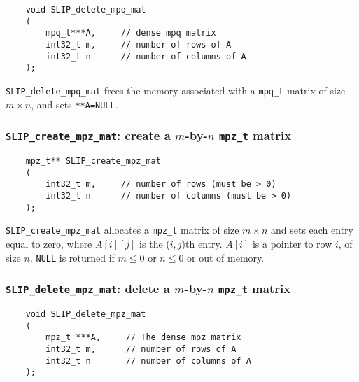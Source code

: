 \documentclass[12pt]{article}
\theoremstyle{definition}
\begin{document}
\begin{mdframed}[userdefinedwidth=6in]
{\footnotesize
\begin{verbatim}
    void SLIP_delete_mpq_mat
    (
        mpq_t***A,     // dense mpq matrix
        int32_t m,     // number of rows of A
        int32_t n      // number of columns of A
    );
\end{verbatim}
} \end{mdframed}


\verb|SLIP_delete_mpq_mat| frees the memory associated with a \verb|mpq_t|
matrix of size $m \times n$, and sets \verb|**A=NULL|.

\cprotect\subsubsection{\verb|SLIP_create_mpz_mat|: create a $m$-by-$n$ \verb|mpz_t| matrix}

\begin{mdframed}[userdefinedwidth=6in]
{\footnotesize
\begin{verbatim}
    mpz_t** SLIP_create_mpz_mat
    (
        int32_t m,     // number of rows (must be > 0)
        int32_t n      // number of columns (must be > 0)
    );
\end{verbatim}
} \end{mdframed}

\verb|SLIP_create_mpz_mat| allocates a \verb|mpz_t| matrix of size $m \times n$
and sets each entry equal to zero, where $A[i][j]$ is the ($i,j$)th entry.
$A[i]$ is a pointer to row $i$, of size $n$. \verb|NULL| is returned if
$m \le 0 $ or $n\le 0$ or out of memory.


\cprotect\subsubsection{\verb|SLIP_delete_mpz_mat|: delete a $m$-by-$n$ \verb|mpz_t| matrix}

\begin{mdframed}[userdefinedwidth=6in]
{\footnotesize
\begin{verbatim}
    void SLIP_delete_mpz_mat
    (
        mpz_t ***A,     // The dense mpz matrix
        int32_t m,      // number of rows of A
        int32_t n       // number of columns of A
    );
\end{verbatim}
} \end{mdframed}
\end{document}
